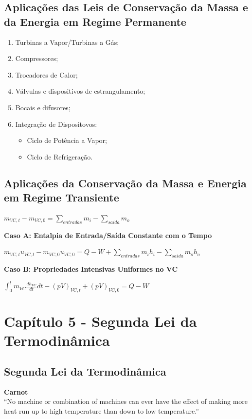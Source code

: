 \documentclass[a4paper, 12pt]{article}
\begin{document}
\subsection{Aplicações das Leis de Conservação da Massa e da Energia em Regime Permanente}
	\begin{enumerate}
		\item Turbinas a Vapor/Turbinas a Gás;
		\item Compressores;
		\item Trocadores de Calor;
		\item Válvulas e dispositivos de estrangulamento;
		\item Bocais e difusores;
		\item Integração de Dispositovos:
			\begin{itemize}
				\item Ciclo de Potência a Vapor;
				\item Ciclo de Refrigeração.
			\end{itemize}
	\end{enumerate}


\subsection{Aplicações da Conservação da Massa e Energia em Regime Transiente}
	\begin{center}
		\large
		$ m_{VC,t} - m_{VC,0} = \sum\limits_{entradas}m_i - \sum\limits_{saida}m_o$
	\end{center}

\textbf{Caso A: Entalpia de Entrada/Saída Constante com o Tempo}\\
	\begin{center}
		\large
		$ m_{VC,t}u_{VC,t} - m_{VC,0}u_{VC,0} = Q - W + \sum\limits_{entradas}m_ih_i - \sum\limits_{saida}m_oh_o $
	\end{center}

\textbf{Caso B: Propriedades Intensivas Uniformes no VC}\\
	\begin{center}
		\large
		$ \int_{0}^{t} m_{VC}\frac{dh_{VC}}{dt}dt - (pV)_{VC,t} + (pV)_{VC,0} = Q - W$
	\end{center}


\newpage
\section{Capítulo 5 - Segunda Lei da Termodinâmica}
\subsection{Segunda Lei da Termodinâmica}
\textbf{Carnot}\\
“No machine or combination of machines
can ever have the effect of making more
heat run up to high temperature than
down to low temperature.”\\
\end{document}
